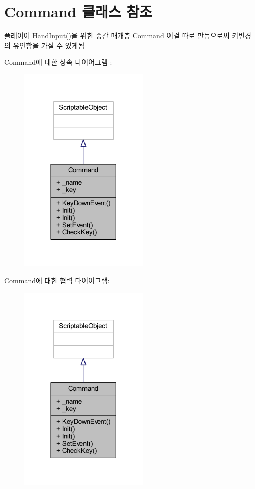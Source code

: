 \hypertarget{class_command}{}\section{Command 클래스 참조}
\label{class_command}


플레이어 Hand\+Input()을 위한 중간 매개층 \mbox{\hyperlink{class_command}{Command}} 이걸 따로 만듬으로써 키변경의 유연함을 가질 수 있게됨  




Command에 대한 상속 다이어그램 \+: \nopagebreak
\begin{figure}[H]
\begin{center}
\leavevmode
\includegraphics[width=177pt]{d8/ddd/class_command__inherit__graph}
\end{center}
\end{figure}


Command에 대한 협력 다이어그램\+:\nopagebreak
\begin{figure}[H]
\begin{center}
\leavevmode
\includegraphics[width=177pt]{db/dd2/class_command__coll__graph}
\end{center}
\end{figure}

